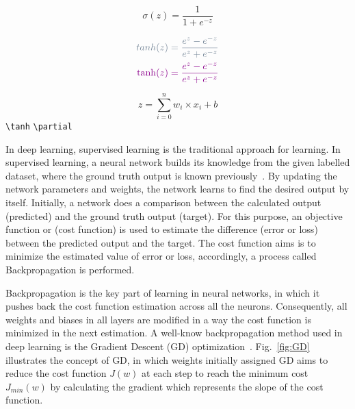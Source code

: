 \begin{equation}
	 \sigma(z) = \frac{1}{1+e^{-z}}
	\label{sigmoid}\end{equation}


\begin{equation}\begin{aligned}
\DIFdelmath{
	tanh(z)=  \frac{e^z-e^{-z}}{e^z+e^{-z}}
}\\
\DIFaddmath{
	\tanh(z)=  \frac{e^z-e^{-z}}{e^z+e^{-z}}
}
\end{aligned}
\label{tanh}\end{equation}


\begin{equation}
	z= \sum_{i=0}^{n}  w_i\times x_i +b
\label{z}\end{equation}
\verb+\tanh+
\verb+\partial+

In deep learning, supervised learning is the traditional approach for learning. 
In supervised learning, a neural network builds its knowledge from the given labelled dataset, where the ground truth output is known previously~\cite{Lecun2015}.
By updating the network parameters and weights, the network learns to find the desired output by itself.
Initially, a network does a comparison between the calculated output (predicted) and the ground truth output (target).
For this purpose, an objective function or (cost function) is used to estimate the difference (error or loss) between the predicted output and the target.
The cost function aims is to minimize the estimated value of error or loss, accordingly, a process called Backpropagation is performed.

Backpropagation is the key part of learning in neural networks, in which it pushes back the cost function estimation across all the neurons.
Consequently, all weights and biases in all layers are modified in a way the cost function is minimized in the next estimation.
A well-know backpropagation method used in deep learning is the Gradient Descent (GD) optimization~\cite{Lecun2015}.
Fig.~\ref{fig:GD} illustrates the concept of GD, in which weights   initially assigned  
GD aims to reduce the cost function \(J(w)\) at each step to reach the minimum cost \(J_{min}(w)\) by calculating the gradient which represents the slope of the cost function.

